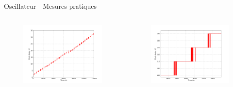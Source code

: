 \documentclass{beamer}
\begin{document}
\begin{frame}{Oscillateur - Mesures pratiques}
\begin{columns}
\begin{column}{0.5\textwidth}
	\begin{figure}
		\centering
		\includegraphics[width=\textwidth,height=0.9\textheight,keepaspectratio]{scale4_int.png}
	\end{figure}
\end{column}
\begin{column}{0.5\textwidth}
	\begin{figure}
		\centering
		\includegraphics[width=\textwidth,height=0.9\textheight,keepaspectratio]{scale2_int.png}
	\end{figure}
\end{column}
\end{columns}
\end{frame}
\end{document}
